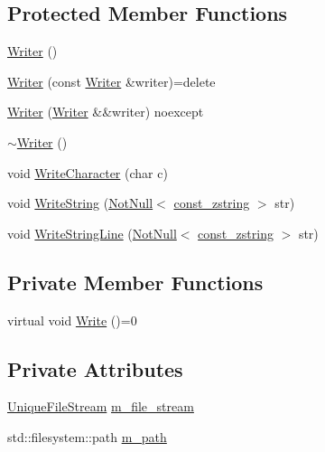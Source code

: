 \subsection*{Protected Member Functions}
\begin{DoxyCompactItemize}
\item 
\mbox{\hyperlink{classmage_1_1_writer_a40b6cd3005d509e670c5a49272d9ef27}{Writer}} ()
\item 
\mbox{\hyperlink{classmage_1_1_writer_a2b257938508732ca0b78241aafa7922c}{Writer}} (const \mbox{\hyperlink{classmage_1_1_writer}{Writer}} \&writer)=delete
\item 
\mbox{\hyperlink{classmage_1_1_writer_abda6f6db577201580c0e97c0816e0d3f}{Writer}} (\mbox{\hyperlink{classmage_1_1_writer}{Writer}} \&\&writer) noexcept
\item 
\mbox{\hyperlink{classmage_1_1_writer_aeeb30d6afb1a271b4ad294889054caec}{$\sim$\+Writer}} ()
\item 
void \mbox{\hyperlink{classmage_1_1_writer_aa1ef04f5e69c44afda56704c2823316c}{Write\+Character}} (char c)
\item 
void \mbox{\hyperlink{classmage_1_1_writer_a0efdf73186727b2ae95072b62eddcf5b}{Write\+String}} (\mbox{\hyperlink{namespacemage_a8769f9d670d6b585ea306cb1062af94b}{Not\+Null}}$<$ \mbox{\hyperlink{namespacemage_abfd9206dc607ceb5d13ec68bf075a5c0}{const\+\_\+zstring}} $>$ str)
\item 
void \mbox{\hyperlink{classmage_1_1_writer_abdfd1361df7bb66e284d031f92c85c05}{Write\+String\+Line}} (\mbox{\hyperlink{namespacemage_a8769f9d670d6b585ea306cb1062af94b}{Not\+Null}}$<$ \mbox{\hyperlink{namespacemage_abfd9206dc607ceb5d13ec68bf075a5c0}{const\+\_\+zstring}} $>$ str)
\end{DoxyCompactItemize}
\subsection*{Private Member Functions}
\begin{DoxyCompactItemize}
\item 
virtual void \mbox{\hyperlink{classmage_1_1_writer_a9baf695ef7f6180bef883f60bcb3ac07}{Write}} ()=0
\end{DoxyCompactItemize}
\subsection*{Private Attributes}
\begin{DoxyCompactItemize}
\item 
\mbox{\hyperlink{namespacemage_a0ee1bd45ad7dbb3dc8c8e1770e3538d4}{Unique\+File\+Stream}} \mbox{\hyperlink{classmage_1_1_writer_ac4884215d1b547e990633474bf61c470}{m\+\_\+file\+\_\+stream}}
\item 
std\+::filesystem\+::path \mbox{\hyperlink{classmage_1_1_writer_a1cc2c110c2652818a7bfdccc8c240fe6}{m\+\_\+path}}
\end{DoxyCompactItemize}


